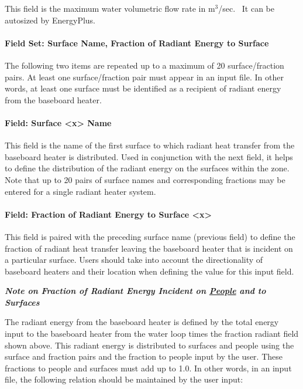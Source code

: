 This field is the maximum water volumetric flow rate in m\(^{3}\)/sec.~ It can be autosized by EnergyPlus.

\paragraph{Field Set: Surface Name, Fraction of Radiant Energy to Surface}\label{field-set-surface-name-fraction-of-radiant-energy-to-surface}

The following two items are repeated up to a maximum of 20 surface/fraction pairs. At least one surface/fraction pair must appear in an input file. In other words, at least one surface must be identified as a recipient of radiant energy from the baseboard heater.

\paragraph{Field: Surface \textless{}x\textgreater{} Name}\label{field-surface-x-name}

This field is the name of the first surface to which radiant heat transfer from the baseboard heater is distributed. Used in conjunction with the next field, it helps to define the distribution of the radiant energy on the surfaces within the zone. Note that up to 20 pairs of surface names and corresponding fractions may be entered for a single radiant heater system.

\paragraph{Field: Fraction of Radiant Energy to Surface \textless{}x\textgreater{}}\label{field-fraction-of-radiant-energy-to-surface-x}

This field is paired with the preceding surface name (previous field) to define the fraction of radiant heat transfer leaving the baseboard heater that is incident on a particular surface. Users should take into account the directionality of baseboard heaters and their location when defining the value for this input field.

\textbf{\emph{Note on Fraction of Radiant Energy Incident on \hyperref[people]{People} and to Surfaces}}

The radiant energy from the baseboard heater is defined by the total energy input to the baseboard heater from the water loop times the fraction radiant field shown above. This radiant energy is distributed to surfaces and people using the surface and fraction pairs and the fraction to people input by the user. These fractions to people and surfaces must add up to 1.0. In other words, in an input file, the following relation should be maintained by the user input:

